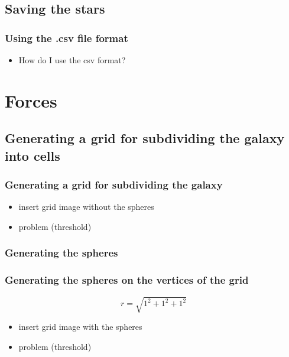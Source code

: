 \documentclass[aspectratio=169]{beamer}
\begin{document}
  \subsection{Saving the stars}

  \begin{frame}
    \frametitle{Using the .csv file format}

    \begin{itemize}
      \item How do I use the csv format?
    \end{itemize}
  \end{frame}

  \section{Forces}
  \subsection{Generating a grid for subdividing the galaxy into cells}

  \begin{frame}
    \frametitle{Generating a grid for subdividing the galaxy}

    \begin{itemize}
      \item insert grid image without the spheres
      \item problem (threshold)
    \end{itemize}
  \end{frame}

  \subsubsection{Generating the spheres}

  \begin{frame}
    \frametitle{Generating the spheres on the vertices of the grid}

    \begin{equation}
      r = \sqrt{1^2 + 1^2 + 1^2}
    \end{equation}

    \begin{itemize}
      \item insert grid image with the spheres
      \item problem (threshold)
    \end{itemize}

  \end{frame}
\end{document}

